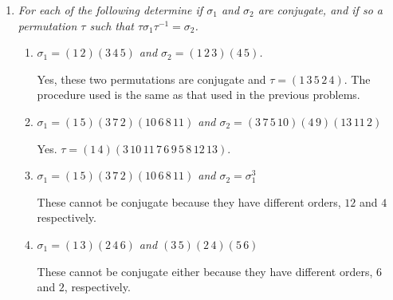 \documentclass[letterpaper, 11pt]{article}
\begin{document}
\begin{enumerate}
\item \emph{For each of the following determine if $\sigma_1$ and $\sigma_2$ are conjugate, and if so a permutation $\tau$ such that $\tau\sigma_1\tau^{-1} = \sigma_2$.}
\begin{enumerate}
\item \emph{$\sigma_1 = (1\,2)(3\,4\,5)$ and $\sigma_2=(1\,2\,3)(4\,5)$.}

Yes, these two permutations are conjugate and $\tau = (1\,3\,5\,2\,4)$.  The procedure used is the same as that used in the previous problems.

\item \emph{$\sigma_1 = (1\,5)(3\,7\,2)(10\,6\,8\,11)$ and $\sigma_2 = (3\,7\,5\, 10)(4\, 9)(13\, 11\, 2)$}

Yes.  $\tau = (1\,4)(3\,10\,11\,7\,6\,9\,5\,8\,12\,13)$.

\item \emph{$\sigma_1 = (1\,5)(3\,7\,2)(10\,6\,8\,11)$ and $\sigma_2 = \sigma_1^3$}

These cannot be conjugate because they have different orders, $12$ and $4$ respectively.

\item \emph{$\sigma_1 = (1\,3)(2\,4\,6)$ and $(3\,5)(2\,4)(5\,6)$}

These cannot be conjugate either because they have different orders, $6$ and $2$, respectively.

\end{enumerate}
\end{enumerate}
\end{document}
